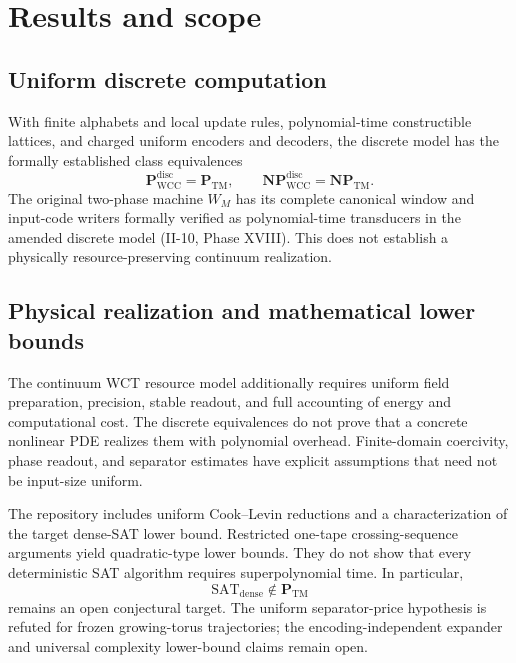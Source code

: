 \documentclass[11pt]{article}
\begin{document}
\section{Results and scope}
\subsection{Uniform discrete computation}
With finite alphabets and local update rules, polynomial-time constructible lattices, and charged uniform encoders and decoders, the discrete model has the formally established class equivalences
\[
\mathbf P_{\mathrm{WCC}}^{\mathrm{disc}}=\mathbf P_{\mathrm{TM}},
\qquad
\mathbf{NP}_{\mathrm{WCC}}^{\mathrm{disc}}=\mathbf{NP}_{\mathrm{TM}}.
\]
The original two-phase machine \(W_M\) has its complete canonical window and input-code writers formally verified as polynomial-time transducers in the amended discrete model (II-10, Phase XVIII). This does not establish a physically resource-preserving continuum realization.

\subsection{Physical realization and mathematical lower bounds}
The continuum WCT resource model additionally requires uniform field preparation, precision, stable readout, and full accounting of energy and computational cost. The discrete equivalences do not prove that a concrete nonlinear PDE realizes them with polynomial overhead. Finite-domain coercivity, phase readout, and separator estimates have explicit assumptions that need not be input-size uniform.

The repository includes uniform Cook--Levin reductions and a characterization of the target dense-SAT lower bound. Restricted one-tape crossing-sequence arguments yield quadratic-type lower bounds. They do not show that every deterministic SAT algorithm requires superpolynomial time. In particular,
\[
\mathrm{SAT}_{\mathrm{dense}}\notin\mathbf P_{\mathrm{TM}}
\]
remains an open conjectural target. The uniform separator-price hypothesis is refuted for frozen growing-torus trajectories; the encoding-independent expander and universal complexity lower-bound claims remain open.
\end{document}
